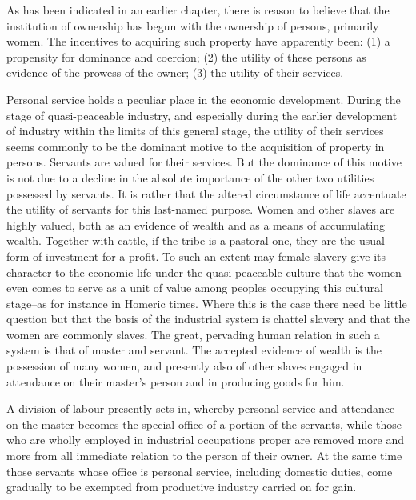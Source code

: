 \documentclass[12pt]{report}
\begin{document}
As has been indicated in an earlier chapter, there is reason to believe
that the institution of ownership has begun with the ownership of
persons, primarily women. The incentives to acquiring such property have
apparently been: (1) a propensity for dominance and coercion; (2) the
utility of these persons as evidence of the prowess of the owner; (3)
the utility of their services.

Personal service holds a peculiar place in the economic development.
During the stage of quasi-peaceable industry, and especially during the
earlier development of industry within the limits of this general stage,
the utility of their services seems commonly to be the dominant motive
to the acquisition of property in persons. Servants are valued for their
services. But the dominance of this motive is not due to a decline
in the absolute importance of the other two utilities possessed by
servants. It is rather that the altered circumstance of life accentuate
the utility of servants for this last-named purpose. Women and other
slaves are highly valued, both as an evidence of wealth and as a means
of accumulating wealth. Together with cattle, if the tribe is a pastoral
one, they are the usual form of investment for a profit. To such an
extent may female slavery give its character to the economic life under
the quasi-peaceable culture that the women even comes to serve as a unit
of value among peoples occupying this cultural stage--as for instance in
Homeric times. Where this is the case there need be little question but
that the basis of the industrial system is chattel slavery and that the
women are commonly slaves. The great, pervading human relation in such a
system is that of master and servant. The accepted evidence of wealth is
the possession of many women, and presently also of other slaves engaged
in attendance on their master's person and in producing goods for him.

A division of labour presently sets in, whereby personal service and
attendance on the master becomes the special office of a portion of the
servants, while those who are wholly employed in industrial occupations
proper are removed more and more from all immediate relation to the
person of their owner. At the same time those servants whose office
is personal service, including domestic duties, come gradually to be
exempted from productive industry carried on for gain.
\end{document}
